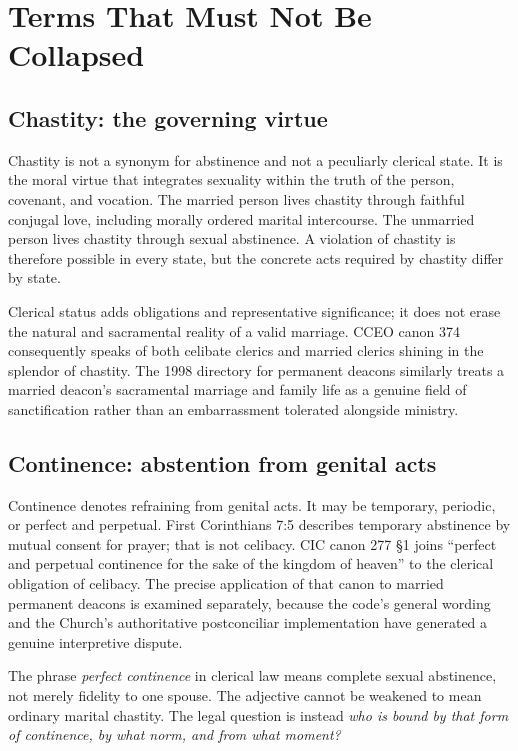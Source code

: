 \section{Terms That Must Not Be Collapsed}

\subsection{Chastity: the governing virtue}

Chastity is not a synonym for abstinence and not a peculiarly clerical state. It is the moral virtue that integrates sexuality within the truth of the person, covenant, and vocation. The married person lives chastity through faithful conjugal love, including morally ordered marital intercourse. The unmarried person lives chastity through sexual abstinence. A violation of chastity is therefore possible in every state, but the concrete acts required by chastity differ by state.

Clerical status adds obligations and representative significance; it does not erase the natural and sacramental reality of a valid marriage. CCEO canon 374 consequently speaks of both celibate clerics and married clerics shining in the splendor of chastity. The 1998 directory for permanent deacons similarly treats a married deacon's sacramental marriage and family life as a genuine field of sanctification rather than an embarrassment tolerated alongside ministry.

\subsection{Continence: abstention from genital acts}

Continence denotes refraining from genital acts. It may be temporary, periodic, or perfect and perpetual. First Corinthians 7:5 describes temporary abstinence by mutual consent for prayer; that is not celibacy. CIC canon 277 \S1 joins ``perfect and perpetual continence for the sake of the kingdom of heaven'' to the clerical obligation of celibacy. The precise application of that canon to married permanent deacons is examined separately, because the code's general wording and the Church's authoritative postconciliar implementation have generated a genuine interpretive dispute.

The phrase \emph{perfect continence} in clerical law means complete sexual abstinence, not merely fidelity to one spouse. The adjective cannot be weakened to mean ordinary marital chastity. The legal question is instead \emph{who is bound by that form of continence, by what norm, and from what moment?}

